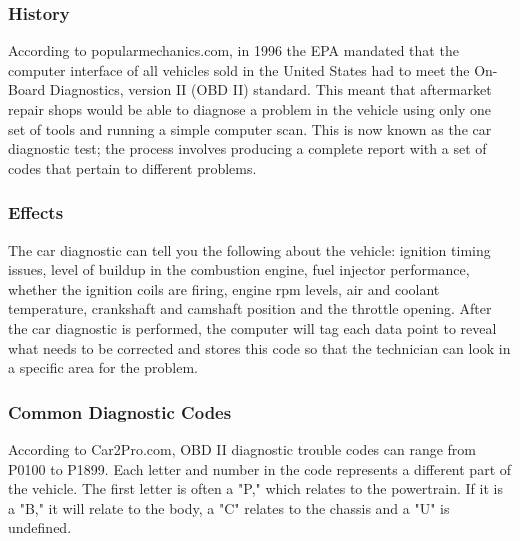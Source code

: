 \subsubsection{History}
According to popularmechanics.com, in 1996 the EPA mandated that the computer interface of all vehicles sold in the United States had to meet the On-Board Diagnostics, version II (OBD II) standard. This meant that aftermarket repair shops would be able to diagnose a problem in the vehicle using only one set of tools and running a simple computer scan. This is now known as the car diagnostic test; the process involves producing a complete report with a set of codes that pertain to different problems.
\subsubsection{Effects}
The car diagnostic can tell you the following about the vehicle: ignition timing issues, level of buildup in the combustion engine, fuel injector performance, whether the ignition coils are firing, engine rpm levels, air and coolant temperature, crankshaft and camshaft position and the throttle opening. After the car diagnostic is performed, the computer will tag each data point to reveal what needs to be corrected and stores this code so that the technician can look in a specific area for the problem.

\subsubsection{Common Diagnostic Codes}
According to Car2Pro.com, OBD II diagnostic trouble codes can range from P0100 to P1899. Each letter and number in the code represents a different part of the vehicle. The first letter is often a "P," which relates to the powertrain. If it is a "B," it will relate to the body, a "C" relates to the chassis and a "U" is undefined.

